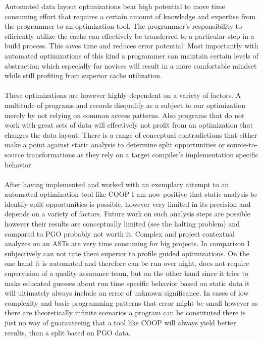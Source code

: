 Automated data layout optimizations bear high potential to move time consuming effort that requires a certain amount of knowledge and expertise from the programmer to an optimization tool. The programmer's responsibility to efficiently utilize the cache can effectively be transferred to a particular step in a build process. This saves time and reduces error potential. Most importantly with automated optimizations of this kind a programmer can maintain certain levels of abstraction which especially for novices will result in a more comfortable mindset while still profiting from superior cache utilization.\\\\
These optimizations are however highly dependent on a variety of factors. A multitude of programs and records disqualify as a subject to our optimization merely by not relying on common access patterns. Also programs that do not work with great sets of data will effectively not profit from an optimization that changes the data layout. There is a range of conceptual contradictions that either make a point against static analysis to determine split opportunities or source-to-source transformations as they rely on a target compiler's implementation specific behavior.\\\\
After having implemented and worked with an exemplary attempt to an automated optimization tool like COOP I am now positive that static analysis to identify split opportunities is possible, however very limited in its precision and depends on a variety of factors. Future work on such analysis steps are possible however their results are conceptually limited (see the halting problem) and compared to PGO probably not worth it. Complex and project contextual analyzes on an ASTs are very time consuming for big projects. In comparison I subjectively can not rate them superior to profile guided optimizations. On the one hand it is automated and therefore can be run over night, does not require supervision of a quality assurance team, but on the other hand since it tries to make educated guesses about run time specific behavior based on static data it will ultimately always include an error of unknown significance. In cases of low complexity and basic programming patterns that error might be small however as there are theoretically infinite scenarios a program can be constituted there is just no way of guaranteeing that a tool like COOP will always yield better results, than a split based on PGO data.\\
